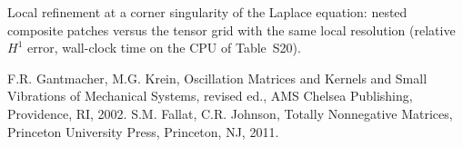 \documentclass[11pt]{article}
\newif\ifincludeproof \includeprooftrue
\begin{document}
\begin{table}[htbp]\centering\footnotesize\setlength{\tabcolsep}{4pt}
\caption{Local refinement at a corner singularity of the Laplace equation: nested composite patches
versus the tensor grid with the same local resolution (relative $H^1$ error, wall-clock time on the CPU of
Table~S20).}

\end{table}

\ifincludeproof
\begin{thebibliography}{9}
 F.R. Gantmacher, M.G. Krein, Oscillation Matrices and Kernels and Small Vibrations of Mechanical Systems, revised ed., AMS Chelsea Publishing, Providence, RI, 2002.
 S.M. Fallat, C.R. Johnson, Totally Nonnegative Matrices, Princeton University Press, Princeton, NJ, 2011.
\end{thebibliography}
\fi
\end{document}

